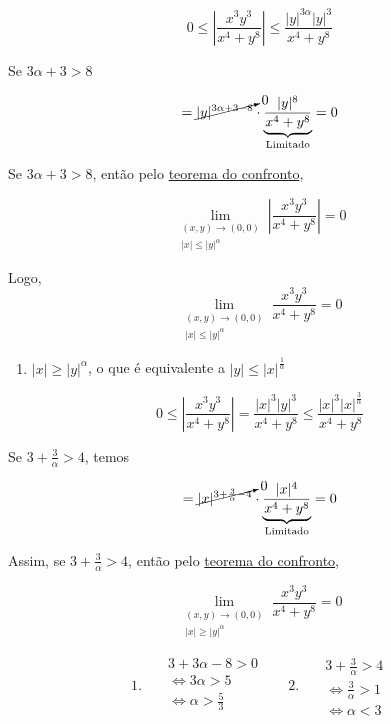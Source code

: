 \documentclass[
  portuguese,
  letterpaper,
  DIV=11,
  numbers=noendperiod]{scrreport}
\providecommand{\tightlist}{%
  \setlength{\itemsep}{0pt}\setlength{\parskip}{0pt}}
\begin{document}
\[
0 \leq \left\lvert \frac{x^3y^3}{x^4+y^8}\right\rvert
\leq \frac{\lvert y \rvert^{3\alpha}\lvert y \rvert^{3}}{x^4+y^8}
\]

Se \(3 \alpha + 3 > 8\)

\[
= \cancelto{0}{\lvert y \rvert ^{3\alpha + 3 - 8}} \cdot
\underbrace{\frac{\lvert y \rvert^8}{x^4+y^8}}_{\text{Limitado}} = 0
\]

Se \(3 \alpha + 3 > 8\), então pelo
\href{limites.qmd$sec-confronto}{teorema do confronto},

\[
\lim_{\begin{aligned}(x,y)\rightarrow (0,0)
\\ \lvert x \rvert \leq \lvert y \rvert^{\alpha}
\end{aligned}} \left\lvert \frac{x^3y^3}{x^4+y^8} \right\rvert = 0
\]

Logo, \[
\lim_{\begin{aligned}(x,y)\rightarrow (0,0)
\\ \lvert x \rvert \leq \lvert y \rvert^{\alpha}
\end{aligned}} \frac{x^3y^3}{x^4+y^8} = 0
\]

\begin{enumerate}
\def\labelenumi{\arabic{enumi}.}
\setcounter{enumi}{1}
\tightlist
\item
  \(\lvert x \rvert \geq \lvert y \rvert^{\alpha}\), o que é equivalente
  a \(\lvert y \rvert \leq \lvert x \rvert^{\frac{1}{\alpha}}\)
\end{enumerate}

\[
0 \leq \left\lvert \frac{x^3y^3}{x^4+y^8}\right\rvert = 
\frac{\lvert x \rvert^3 \lvert y \rvert^3}{x^4+y^8}
\leq \frac{\lvert x \rvert^3 \lvert x \rvert^{\frac{3}{\alpha}}}{x^4+y^8}
\]

Se \(3 + \frac{3}{\alpha} > 4\), temos

\[
= \cancelto{0}{\lvert x \rvert^{3+ \frac{3}{\alpha}-4}} \cdot
\underbrace{\frac{\lvert x \rvert^4}{x^4+y^8}}_{\text{Limitado}} = 0
\]

Assim, se \(3 + \frac{3}{\alpha} > 4\), então pelo
\href{limites.qmd$sec-confronto}{teorema do confronto},

\[
\lim_{\begin{aligned}(x,y)\rightarrow (0,0)
\\ \lvert x \rvert \geq \lvert y \rvert^{\alpha}
\end{aligned}} \frac{x^3y^3}{x^4+y^8} = 0
\]

\[
1. ~~~
\begin{aligned}
  &3 + 3\alpha - 8 > 0 \\
  &\Leftrightarrow 3\alpha > 5 \\
  &\Leftrightarrow \alpha > \frac{5}{3} \\
\end{aligned} ~~~~~~~~
2. ~~~
\begin{aligned}
  &3 + \frac{3}{\alpha} > 4 \\
  &\Leftrightarrow \frac{3}{\alpha} > 1 \\
  &\Leftrightarrow \alpha < 3
\end{aligned}
\]
\end{document}
